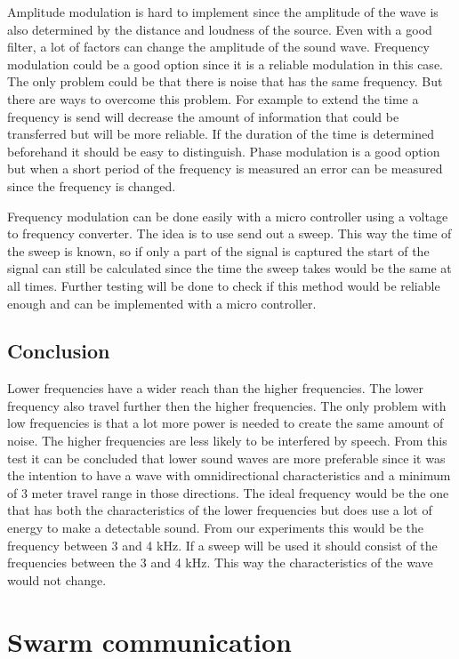\documentclass[10pt,a4paper]{article}
\begin{document}
Amplitude modulation is hard to implement since the amplitude of the wave is also determined by the distance and loudness of the source. Even with a good filter, a lot of factors can change the amplitude of the sound wave. Frequency modulation could be a good option since it is a reliable modulation in this case. The only problem could be that there is noise that has the same frequency. But there are ways to overcome this problem. For example to extend the time a frequency is send will decrease the amount of information that could be transferred but will be more reliable. If the duration of the time is determined beforehand it should be easy to distinguish. Phase modulation is a good option but when a short period of the frequency is measured an error can be measured since the frequency is changed. 

Frequency modulation can be done easily with a micro controller using a voltage to frequency converter. The idea is to use send out a sweep. This way the time of the sweep is known, so if only a part of the signal is captured the start of the signal can still be calculated since the time the sweep takes would be the same at all times. Further testing will be done to check if this method would be reliable enough and can be implemented with a micro controller.


\subsection{Conclusion}

Lower frequencies have a wider reach than the higher frequencies. The lower frequency also travel further then the higher frequencies. The only problem with low frequencies is that a lot more power is needed to create the same amount of noise. The higher frequencies are less likely to be interfered by speech. From this test it can be concluded that lower sound waves are more preferable since it was the intention to have a wave with omnidirectional characteristics and a minimum of 3 meter travel range in those directions. The ideal frequency would be the one that has both the characteristics of the lower frequencies but does use a lot of energy to make a detectable sound. From our experiments this would be the frequency between 3 and 4 kHz. If a sweep will be used it should consist of the frequencies between the 3 and 4 kHz. This way the characteristics of the wave would not change. 


\newpage
\section{Swarm communication}
\end{document}

